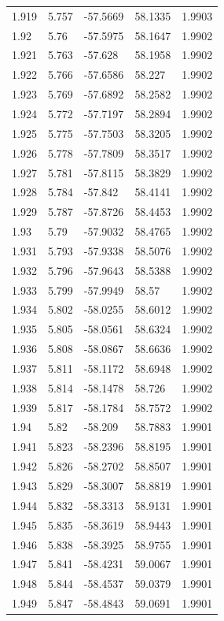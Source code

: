 \begin{tabular}{lllll}
1.919 & 5.757 & -57.5669 & 58.1335 & 1.9903 \\
1.92 & 5.76 & -57.5975 & 58.1647 & 1.9902 \\
1.921 & 5.763 & -57.628 & 58.1958 & 1.9902 \\
1.922 & 5.766 & -57.6586 & 58.227 & 1.9902 \\
1.923 & 5.769 & -57.6892 & 58.2582 & 1.9902 \\
1.924 & 5.772 & -57.7197 & 58.2894 & 1.9902 \\
1.925 & 5.775 & -57.7503 & 58.3205 & 1.9902 \\
1.926 & 5.778 & -57.7809 & 58.3517 & 1.9902 \\
1.927 & 5.781 & -57.8115 & 58.3829 & 1.9902 \\
1.928 & 5.784 & -57.842 & 58.4141 & 1.9902 \\
1.929 & 5.787 & -57.8726 & 58.4453 & 1.9902 \\
1.93 & 5.79 & -57.9032 & 58.4765 & 1.9902 \\
1.931 & 5.793 & -57.9338 & 58.5076 & 1.9902 \\
1.932 & 5.796 & -57.9643 & 58.5388 & 1.9902 \\
1.933 & 5.799 & -57.9949 & 58.57 & 1.9902 \\
1.934 & 5.802 & -58.0255 & 58.6012 & 1.9902 \\
1.935 & 5.805 & -58.0561 & 58.6324 & 1.9902 \\
1.936 & 5.808 & -58.0867 & 58.6636 & 1.9902 \\
1.937 & 5.811 & -58.1172 & 58.6948 & 1.9902 \\
1.938 & 5.814 & -58.1478 & 58.726 & 1.9902 \\
1.939 & 5.817 & -58.1784 & 58.7572 & 1.9902 \\
1.94 & 5.82 & -58.209 & 58.7883 & 1.9901 \\
1.941 & 5.823 & -58.2396 & 58.8195 & 1.9901 \\
1.942 & 5.826 & -58.2702 & 58.8507 & 1.9901 \\
1.943 & 5.829 & -58.3007 & 58.8819 & 1.9901 \\
1.944 & 5.832 & -58.3313 & 58.9131 & 1.9901 \\
1.945 & 5.835 & -58.3619 & 58.9443 & 1.9901 \\
1.946 & 5.838 & -58.3925 & 58.9755 & 1.9901 \\
1.947 & 5.841 & -58.4231 & 59.0067 & 1.9901 \\
1.948 & 5.844 & -58.4537 & 59.0379 & 1.9901 \\
1.949 & 5.847 & -58.4843 & 59.0691 & 1.9901 \\

\end{tabular}
